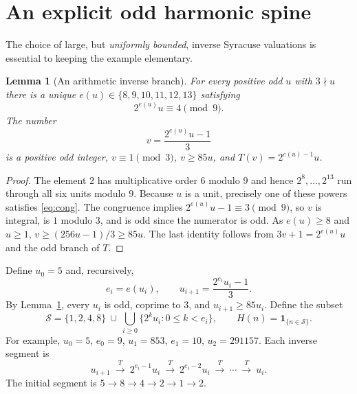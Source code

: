 \documentclass[11pt,a4paper]{article}
\newtheorem{lemma}[theorem]{Lemma}
\newcommand{\one}{\mathbf 1}
\begin{document}
\section{An explicit odd harmonic spine}
The choice of large, but \emph{uniformly bounded}, inverse Syracuse
valuations is essential to keeping the example elementary.
\begin{lemma}[An arithmetic inverse branch]\label{lem:branch}
For every positive odd $u$ with $3\nmid u$ there is a unique
$e(u)\in\{8,9,10,11,12,13\}$ satisfying
\begin{equation}\label{eq:cong}
 2^{e(u)}u\equiv4\pmod 9.
\end{equation}
The number
\begin{equation}\label{eq:inverse}
 v=\frac{2^{e(u)}u-1}{3}
\end{equation}
is a positive odd integer, $v\equiv1\pmod3$, $v\ge85u$, and
$T(v)=2^{e(u)-1}u$.
\end{lemma}
\begin{proof}
The element $2$ has multiplicative order $6$ modulo $9$ and hence
$2^8,\ldots,2^{13}$ run through all six units modulo $9$.
Because $u$ is a unit, precisely one of these powers satisfies
\eqref{eq:cong}.  The congruence implies $2^{e(u)}u-1\equiv3\pmod9$,
so $v$ is integral, is $1$ modulo $3$, and is odd since the numerator
is odd.  As $e(u)\ge8$ and $u\ge1$,
$v\ge(256u-1)/3\ge85u$.  The last identity follows from
$3v+1=2^{e(u)}u$ and the odd branch of $T$.
\end{proof}

Define $u_0=5$ and, recursively,
\[
 e_i=e(u_i),\qquad u_{i+1}=\frac{2^{e_i}u_i-1}{3}.
\]
By Lemma~\ref{lem:branch}, every $u_i$ is odd, coprime to $3$, and
$u_{i+1}\ge85u_i$.  Define the subset
\begin{equation}\label{eq:support}
 \mathcal S=\{1,2,4,8\}\ \cup\
 \bigcup_{i\ge0}\{2^k u_i:0\le k<e_i\},
 \qquad H(n)=\one_{\{n\in\mathcal S\}}.
\end{equation}
For example, $u_0=5$, $e_0=9$, $u_1=853$, $e_1=10$,
$u_2=291157$.  Each inverse segment is
\[
 u_{i+1}\ \xrightarrow{\ T\ }\ 2^{e_i-1}u_i
 \ \xrightarrow{\ T\ }\ 2^{e_i-2}u_i
 \ \xrightarrow{\ T\ }\ \cdots\ \xrightarrow{\ T\ }\ u_i.
\]
The initial segment is $5\to8\to4\to2\to1\to2$.
\end{document}
